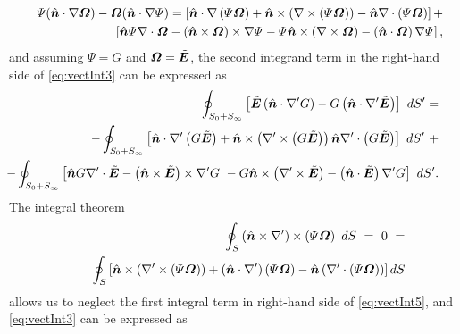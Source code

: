 \begin{eqnarray}
& &\Psi (\hat{\mbfit{n}} \cdot \nabla \mbfit{\Omega}) - \mbfit{\Omega} (\hat{\mbfit{n}} \cdot \nabla \Psi) = \left [  \hat{\mbfit{n}} \cdot \nabla \left ( \Psi \mbfit{\Omega} \right ) + \hat{\mbfit{n}} \times \left ( \nabla \times \left ( \Psi \mbfit{\Omega} \right )  \right ) - \hat{\mbfit{n}} \nabla \cdot \left ( \Psi \mbfit{\Omega} \right ) \right ] + \nonumber \\
& &\hspace{.5cm}\left [ \hat{\mbfit{n}} \Psi \nabla \cdot \mbfit{\Omega}  - \left ( \hat{\mbfit{n}} \times \mbfit{\Omega} \right ) \times \nabla \Psi - \Psi \hat{\mbfit{n}} \times \left ( \nabla \times \mbfit{\Omega} \right )  - \left ( \hat{\mbfit{n}} \cdot \mbfit{\Omega}  \right ) \nabla \Psi \right ],
\end{eqnarray} and assuming $\Psi = G$ and $\mbfit{\Omega} = \tilde{\mbfit{E}}$, the second integrand term in the right-hand side of \eqref{eq:vectInt3} can be expressed as
\begin{eqnarray}
\label{eq:vectInt5}
& & \oint_{S_0+S_{\infty}} \left [\tilde{\mbfit{E}} \left ( \hat{\mbfit{n}} \cdot {\nabla}' G \right ) - G \left ( \hat{\mbfit{n}} \cdot {\nabla}' \tilde{\mbfit{E}} \right ) \right ] \ dS' =  \nonumber \\
& & \hspace{-0.5cm} - \oint_{S_0+S_{\infty}} \left [  \hat{\mbfit{n}} \cdot {\nabla}' \left ( G \tilde{\mbfit{E}} \right ) + \hat{\mbfit{n}} \times \left ( {\nabla}' \times \left (  G \tilde{\mbfit{E}} \right ) \right ) \hat{\mbfit{n}} {\nabla}' \cdot \left (  G \tilde{\mbfit{E}} \right ) \right ] \ dS' \ +  \nonumber \\
& & \hspace{-1cm} - \oint_{S_0+S_{\infty}} \left [ \hat{\mbfit{n}}  G {\nabla}' \cdot \tilde{\mbfit{E}} - \left ( \hat{\mbfit{n}} \times \tilde{\mbfit{E}} \right ) \times {\nabla}'  G \ - G \hat{\mbfit{n}} \times \left ( {\nabla}' \times \tilde{\mbfit{E}} \right )  - \left ( \hat{\mbfit{n}} \cdot \tilde{\mbfit{E}}  \right ) {\nabla}'  G \right ] \ dS'.
\end{eqnarray} The integral theorem \cite{OrfanidisEWA}
\begin{eqnarray}
& &\oint_S \left ( \hat{\mbfit{n}} \times {\nabla}' \right ) \times \left ( \Psi \mbfit{\Omega} \right ) \ dS \ = \ 0 \ = \nonumber \\
& &\hspace{.5cm} \oint_S \left [ \hat{\mbfit{n}} \times \left ( {\nabla}' \times\left ( \Psi \mbfit{\Omega} \right ) \right ) + \left ( \hat{\mbfit{n}} \cdot {\nabla}' \right ) \left ( \Psi \mbfit{\Omega} \right ) - \hat{\mbfit{n}} \left ( {\nabla}' \cdot \left ( \Psi \mbfit{\Omega} \right ) \right ) \right] dS
\end{eqnarray} allows us to neglect the first integral term in right-hand side of \eqref{eq:vectInt5}, and \eqref{eq:vectInt3} can be expressed as
